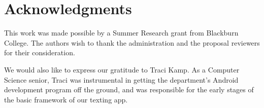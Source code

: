 \section{Acknowledgments}
This work was made possible by a Summer Research grant from Blackburn College. The authors
wish to thank the administration and the proposal reviewers for their consideration.

We would also like to express our gratitude to Traci Kamp. As a Computer Science senior, Traci
was instrumental in getting the department's Android development program off the ground, and
was responsible for the early stages of the basic framework of our texting app.

